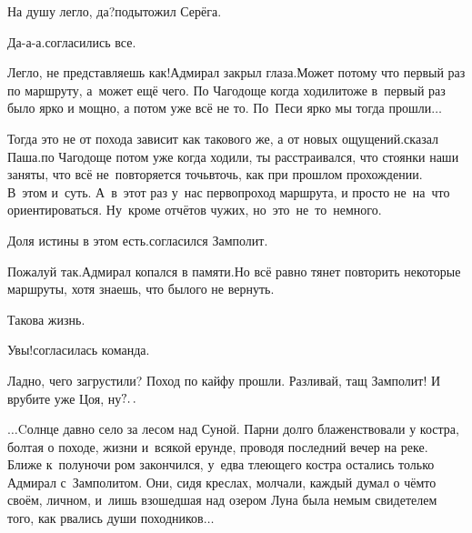 \diagdash На душу легло, да?\mdash подытожил Серёга.

\diagdash Да-а-а.\mdash согласились все.

\diagdash Легло, не представляешь как!\mdash Адмирал закрыл глаза.\mdash Может потому что первый раз по маршруту, а~может ещё чего. По Чагодоще когда ходили\mdash тоже в~первый раз было ярко и мощно, а потом уже всё не то. По~Песи ярко мы тогда прошли$\ldots$

\diagdash Тогда это не от похода зависит как такового же, а от новых ощущений.\mdash сказал Паша.\mdash по Чагодоще потом уже когда ходили, ты расстраивался, что стоянки наши заняты, что всё не~повторяется точь\sdash в\sdash точь, как при прошлом прохождении. В~этом и~суть. А~в~этот раз у~нас первопроход маршрута, и просто не~на~что ориентироваться. Ну~кроме отчётов чужих, но~это~не~то~немного.

\diagdash Доля истины в этом есть.\mdash согласился Замполит.

\diagdash Пожалуй так.\mdash Адмирал копался в памяти.\mdash Но всё равно тянет повторить некоторые маршруты, хотя знаешь, что былого не вернуть.

\diagdash Такова жизнь.

\diagdash Увы!\mdash согласилась команда.

\diagdash Ладно, чего загрустили? Поход по кайфу прошли. Разливай, тащ Замполит! И врубите уже Цоя, ну$\mathpunct{?\ldotp\ldotp}$ %

\vspace{1em}
$\ldots$Cолнце давно село за лесом над Суной. Парни долго блаженствовали у костра, болтая о походе, жизни и~всякой ерунде, проводя последний вечер на реке. Ближе к~полуночи ром закончился, у~едва тлеющего костра остались только Адмирал с~Замполитом. Они, сидя креслах, молчали, каждый думал о чём\sdash то своём, личном, и~лишь взошедшая над озером Луна была немым свидетелем того, как рвались души походников$\ldots$


\begin{center}
\end{center}
